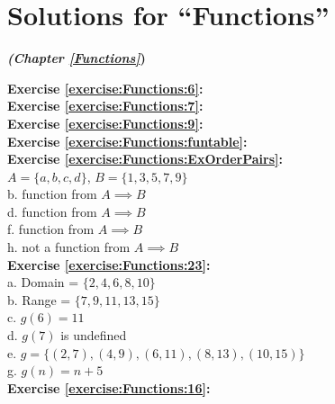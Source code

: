 \section{Solutions for ``Functions''}
\noindent\textbf{\textit{ (Chapter \ref{Functions}})}\bigskip


\noindent\textbf{Exercise \ref{exercise:Functions:6}:}\\

\noindent\textbf{Exercise \ref{exercise:Functions:7}:}\\

\noindent\textbf{Exercise \ref{exercise:Functions:9}:}\\

\noindent\textbf{Exercise \ref{exercise:Functions:funtable}:}\\

\noindent\textbf{Exercise \ref{exercise:Functions:ExOrderPairs}:}\\
$A=\{a,b,c,d\}$, $B=\{1,3,5,7,9\}$\\
b. function from $A \implies B$\\
d. function from $A \implies B$\\
f. function from $A \implies B$\\
h. not a function from $A \implies B$\\


\noindent\textbf{Exercise \ref{exercise:Functions:23}:}\\
a. Domain = $\{2,4,6,8,10\}$\\
b. Range = $\{7,9,11,13,15\}$\\
c. $g(6)=11$\\
d. $g(7)$ is undefined\\
e. $g=\{(2,7),(4,9),(6,11),(8,13),(10,15)\}$\\
g. $g(n)=n+5$\\


\noindent\textbf{Exercise \ref{exercise:Functions:16}:}\\


